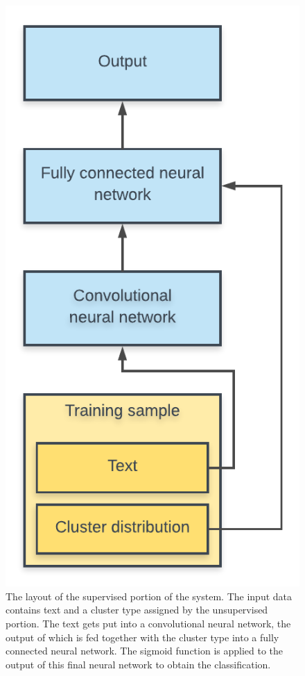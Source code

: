 \begin{figure}[tbp]
  \centering
  \begin{minipage}[c]{0.5\textwidth}
    \includegraphics[width=\textwidth]{figures/nn_layout.pdf}
  \end{minipage}
  \hfill
  \begin{minipage}[c]{0.49\textwidth}
    \caption{The layout of the supervised portion of the system. The input data
    contains text and a cluster type assigned by the unsupervised portion. The
    text gets put into a convolutional neural network, the output of which is
    fed together with the cluster type into a fully connected neural network.
    The sigmoid function is applied to the output of this final neural network
    to obtain the classification.\label{fig:nn_layout}}
  \end{minipage}
\end{figure}

